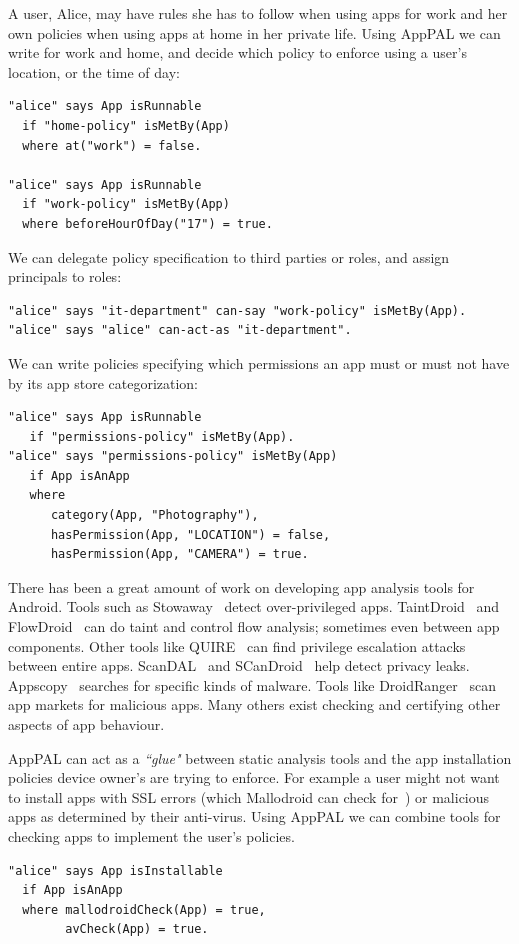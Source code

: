 \documentclass[]{llncs}
\newcommand{\citep}[1]{\cite{#1}}
\begin{document}
A user, Alice, may have rules she has to follow when using apps for work and her own policies when using apps at home in her private life.
Using AppPAL we can write for work and home, and decide which policy to enforce using a user's location, or the time of day:
\begin{lstlisting}
"alice" says App isRunnable
  if "home-policy" isMetBy(App)
  where at("work") = false.

"alice" says App isRunnable
  if "work-policy" isMetBy(App)
  where beforeHourOfDay("17") = true.
\end{lstlisting}
We can delegate policy specification to third parties or roles, and assign principals to roles:
\begin{lstlisting}
"alice" says "it-department" can-say "work-policy" isMetBy(App).
"alice" says "alice" can-act-as "it-department".
\end{lstlisting}
We can write policies specifying which permissions an app must or must not have by its app store categorization:
    \begin{lstlisting}
"alice" says App isRunnable
   if "permissions-policy" isMetBy(App).
"alice" says "permissions-policy" isMetBy(App)
   if App isAnApp
   where
      category(App, "Photography"),
      hasPermission(App, "LOCATION") = false,
      hasPermission(App, "CAMERA") = true.
    \end{lstlisting}

There has been a great amount of work on developing app analysis tools for Android.
Tools such as Stowaway~\cite{Felt:2011kj} detect over-privileged apps.
TaintDroid~\cite{Enck:2010uw} and FlowDroid~\cite{Fritz:2013vi} can do taint and control flow analysis; sometimes even between app components.
Other tools like QUIRE~\cite{Bugiel:2012ui} can find privilege escalation attacks between entire apps.
ScanDAL~\cite{Kim:2012vt} and SCanDroid~\cite{Fuchs:2009vi} help detect privacy leaks.
Appscopy~\cite{Feng:kPGZr_ja} searches for specific kinds of malware.
Tools like DroidRanger~\cite{Zhou:2012tb} scan app markets for malicious apps.
Many others exist checking and certifying other aspects of app behaviour.

AppPAL can act as a \emph{``glue"} between static analysis tools and the app installation policies device owner's are trying to enforce.
For example a user might not want to install apps with SSL errors (which Mallodroid can check for~\citep{Fahl:2012dj}) or malicious apps as determined by their anti-virus.
Using AppPAL we can combine tools for checking apps to implement the user's policies.
\begin{lstlisting}
"alice" says App isInstallable
  if App isAnApp
  where mallodroidCheck(App) = true,
        avCheck(App) = true.
\end{lstlisting}
\end{document}

